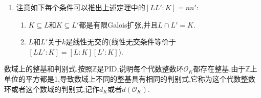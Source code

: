 \begin{enumerate}
\begin{proof}
    	最后我们说明这组整基的判别式是$d^{n'}(d')^n$.这个判别式是一个$nn'$方阵$M=(\sigma_s\omega_i\sigma_t'\omega_j')$的行列式,这是$n$阶矩阵$(\sigma_s\omega_i)$和$(\sigma_t'\omega_j')$的张量积,张量积的行列式是$d^{n'}(d')^n$.
    \end{proof}
    \item 注意如下每个条件可以推出上述定理中的$[LL':K]=nn'$:
    \begin{enumerate}
    	\item $K\subseteq L$和$K\subseteq L'$都是有限Galois扩张,并且$L\cap L'=K$.
    	\item $L$和$L'$关于$k$是线性无交的(线性无交条件等价于$[LL':K]=[L:K][L':K]$).
    \end{enumerate}
\end{enumerate}

数域上的整基和判别式.按照$\mathbb{Z}$是PID,说明每个代数整数环$\mathscr{O}_K$都存在整基.由于$\mathbb{Z}$上单位的平方都是1,导致数域上不同的整基具有相同的判别式,它称为这个代数整数环或者这个数域的判别式,记作$d_K$或者$d(\mathscr{O}_K)$.
